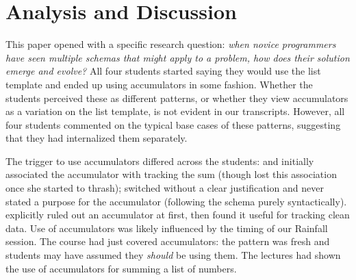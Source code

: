 




\section{Analysis and Discussion}

This paper opened with a specific research question: \emph{when novice
programmers have seen multiple schemas that might apply to a problem, how
does their solution emerge and evolve?}  
All four students started saying they would use the list template and
ended up using accumulators in some fashion. 
Whether the students perceived these as
different patterns, or whether they view accumulators as a variation
on the list template, is not evident in our transcripts.  However,
all four students commented on the typical base cases of these
patterns, suggesting that they had internalized them separately.

The trigger to use accumulators differed across the students: \sthree
and \ssix initially associated the accumulator with tracking the sum
(though \sthree lost this association once
she started to thrash); \sseven switched without a clear justification
and never stated a purpose for the accumulator (following the schema
purely syntactically). \sten explicitly ruled out an accumulator at
first, then found it useful for tracking clean data.  
Use of accumulators was likely influenced by the timing of our
Rainfall session. The course had just covered accumulators: the
pattern was fresh and students may have assumed they \emph{should} be
using them. The lectures had shown the use of accumulators for summing a
list of numbers.

